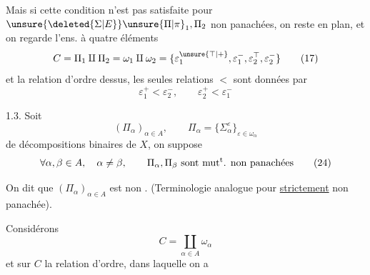 \begingroup\makeatletter\tagsleft@true\makeatother
Mais si cette condition n'est pas satisfaite pour $\unsure{\deleted{\Sigma|E}}\unsure{\Pi|\pi}_1,\Pi_2$ non panachées, on reste en plan, et on regarde l'ens. à quatre éléments
\[
C=\Pi_1\amalg\Pi_2=\omega_1\amalg\omega_2
=\{\varepsilon_1^{\unsure{\top|+}},\varepsilon_1^-,\varepsilon_2^{\top},\varepsilon_2^-\}
\tag*{(17)}
\]
et la relation d'ordre dessus,  les seules relations $<$ sont données par
\[
\varepsilon_1^+<\varepsilon_2^-,\qquad\varepsilon_2^+<\varepsilon_1^-
\tag*{(22)}
\]

1.3. Soit 
\[
(\Pi_\alpha)_{\alpha\in A},\qquad \Pi_\alpha=\{\Sigma_\alpha^\varepsilon\}_{\varepsilon\in\omega_\alpha}
\tag*{(23)}
\]
   de décompositions binaires de $X$, on suppose 
\[
\forall\alpha,\beta\in A,\quad\alpha\ne\beta,\qquad
\Pi_\alpha,\Pi_\beta\ \text{sont mut\textsuperscript{t}. non panachées}
\tag*{(24)}
\]

 On dit  que $(\Pi_\alpha)_{\alpha\in A}$ est non . (Terminologie analogue pour \uline{strictement} non panachée).

Considérons
\[
C=\coprod_{\alpha\in A}\omega_\alpha
\tag*{(25)}
\]
et sur $C$ la relation d'ordre, dans laquelle on a

\endgroup
\clearpage
